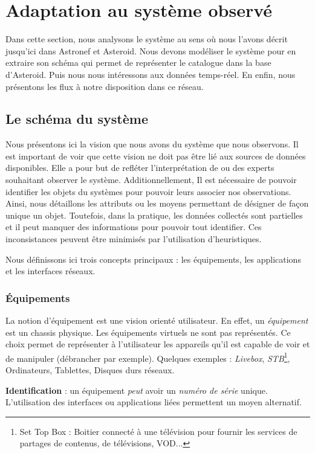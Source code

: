 \section{Adaptation au système observé}\label{sec:valid:domvision:systeme}
Dans cette section, nous analysons le système au sens où nous l'avons décrit jusqu'ici dans Astronef et Asteroid. Nous devons modéliser le système pour en extraire son schéma qui permet de représenter le catalogue dans la base d'Asteroid. Puis nous nous intéressons aux données temps-réel. En enfin, nous présentons les flux à notre disposition dans ce réseau.

\subsection{Le schéma du système}
Nous présentons ici la vision que nous avons du système que nous observons. Il est important de voir que cette vision ne doit pas être lié aux sources de données disponibles. Elle a pour but de refléter l'interprétation de ou des experts souhaitant observer le système. Additionnellement, Il est nécessaire de pouvoir identifier les objets du systèmes pour pouvoir leurs associer nos observations. Ainsi, nous détaillons les attributs ou les moyens permettant de désigner de façon unique un objet. Toutefois, dans la pratique, les données collectés sont partielles et il peut manquer des informations pour pouvoir tout identifier. Ces inconsistances peuvent être minimisés par l'utilisation d'heuristiques.

Nous définissons ici trois concepts principaux : les équipements, les applications et les interfaces réseaux.

\subsubsection{Équipements}
La notion d'équipement est une vision orienté utilisateur. En effet, un \textit{équipement} est un chassis physique. Les équipements virtuels ne sont pas représentés. Ce choix permet de représenter à l'utilisateur les appareils qu'il est capable de voir et de manipuler (débrancher par exemple). Quelques exemples : \textit{Livebox}, \textit{STB}\footnote{Set Top Box : Boitier connecté à une télévision pour fournir les services de partages de contenus, de télévisions, VOD...}, Ordinateurs, Tablettes, Disques durs réseaux.

\textbf{Identification} : un équipement \textit{peut} avoir un \textit{numéro de série} unique. L'utilisation des interfaces ou applications liées permettent un moyen alternatif.

